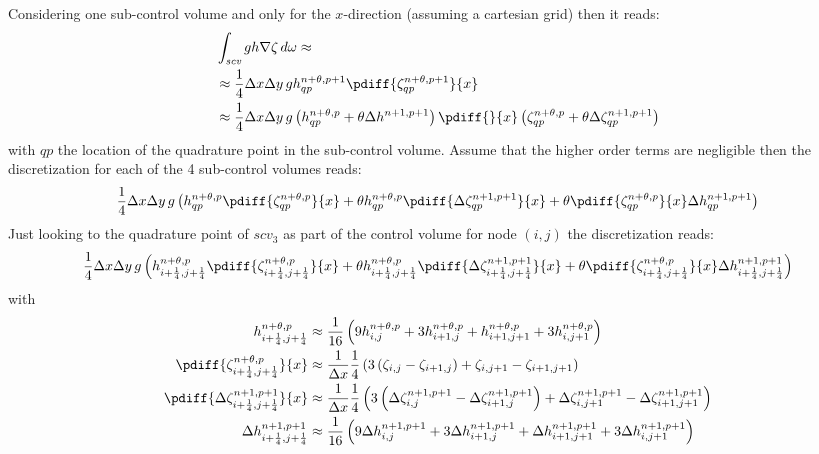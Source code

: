 Considering one sub-control volume and only for the $x$-direction (assuming a cartesian grid) then it reads:
\begin{align}
    & \int_{\textit{scv}} gh \nabla \zeta \, d\omega  \approx
    \\
    & \approx \quart \Dx\Dy\, g h^{n+\theta,p+1}_{qp} \pdiff{\zeta^{n+\theta,p+1}_{qp}}{x}
    \\
   & \approx \quart  \Dx\Dy\, g \left( h^{n+\theta,p}_{qp} + \theta \Delta h^{n+1,p+1}\right)  \pdiff{}{x}\left(\zeta^{n+\theta,p}_{qp} + \theta \Delta \zeta^{n+1,p+1}_{qp}\right)
\end{align}
with $qp$ the location of the quadrature point in the sub-control volume.
Assume that the higher order terms are negligible then the discretization for each of the 4 sub-control volumes reads:
\begin{align}
        \quart  \Dx\Dy\, g \left(
        h^{n+\theta, p}_{qp} \pdiff{\zeta^{n+\theta, p}_{qp}}{x}
        + \theta h^{n+\theta, p}_{qp} \pdiff{\Delta \zeta^{n+1, p+1}_{qp}}{x}
        + \theta \pdiff{\zeta^{n+\theta, p}_{qp}}{x} \Delta h^{n+1,p+1}_{qp}
          \right)
\end{align}
Just looking to the quadrature point of $scv_3$ as part of the control volume for node $(i,j)$ the discretization reads:
\begin{align}
    \quart  \Dx\Dy\, g \left(
    h^{n+\theta, p}_{i+\quart, j+\quart} \pdiff{\zeta^{n+\theta, p}_{i+\quart, j+\quart}}{x}
    + \theta h^{n+\theta, p}_{i+\quart, j+\quart} \pdiff{\Delta \zeta^{n+1, p+1}_{i+\quart, j+\quart}}{x}
    + \theta \pdiff{\zeta^{n+\theta, p}_{i+\quart, j+\quart}}{x} \Delta h^{n+1,p+1}_{i+\quart, j+\quart}
    \right)
\end{align}
with
\begin{align}
    h^{n+\theta, p}_{i+\quart, j+\quart} & \approx
    \frac{1}{16}\left( 9h^{n+\theta, p}_{i, j} + 3 h^{n+\theta, p}_{i+1,j} + h^{n+\theta, p}_{i+1, j+1} + 3  h^{n+\theta, p}_{i, j+1}\right)
    \\*
    \pdiff{\zeta^{n+\theta, p}_{i+\quart, j+\quart}}{x} & \approx
   \frac{1}{\Dx}\quart\left( 3 \left(\zeta_{i,j} - \zeta_{i+1,j}\right) + \zeta_{i,j+1} - \zeta_{i+1,j+1} \right)
   \\*
   \pdiff{\Delta \zeta^{n+1, p+1}_{i+\quart, j+\quart}}{x} & \approx
   \frac{1}{\Dx}\quart\left( 3 \left(\Delta\zeta^{n+1, p+1}_{i,j} - \Delta\zeta^{n+1, p+1}_{i+1,j}\right) + \Delta\zeta^{n+1, p+1}_{i,j+1} - \Delta\zeta^{n+1, p+1}_{i+1,j+1} \right)
   \\*
   \Delta h^{n+1,p+1}_{i+\quart, j+\quart} & \approx
   \frac{1}{16}\left( 9\Delta h^{n+1,p+1}_{i, j} + 3 \Delta h^{n+1,p+1}_{i+1,j} + \Delta h^{n+1,p+1}_{i+1, j+1} + 3  \Delta h^{n+1,p+1}_{i, j+1}\right)
\end{align}
